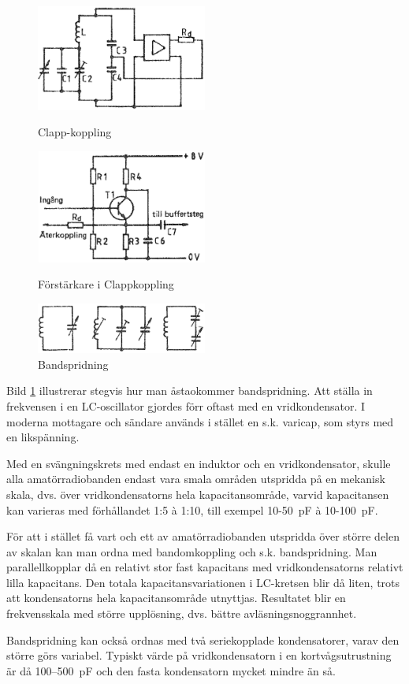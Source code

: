 \begin{figure}
  \includegraphics[width=0.5\textwidth]{images/cropped_pdfs/bild_2_3-73a.pdf}
  \caption{Clapp-koppling}
  \label{fig:BildII3-73a}

  \includegraphics[width=0.5\textwidth]{images/cropped_pdfs/bild_2_3-73b.pdf}
  \caption{Förstärkare i Clappkoppling}
  \label{fig:BildII3-73b}

  \includegraphics[width=0.5\textwidth]{images/cropped_pdfs/bild_2_3-74.pdf}
  \caption{Bandspridning}
  \label{fig:BildII3-74}
\end{figure}

Bild \ref{fig:BildII3-74} illustrerar stegvis hur man åstaokommer
bandspridning.
Att ställa in frekvensen i en LC-oscillator gjordes förr oftast med en
vridkondensator.
I moderna mottagare och sändare används i stället en s.k. varicap, som styrs
med en likspänning.

Med en svängningskrets med endast en induktor och en vridkondensator, skulle
alla amatörradiobanden endast vara smala områden utspridda på en mekanisk
skala, dvs. över vridkondensatorns hela kapacitansområde, varvid
kapacitansen kan varieras med förhållandet 1:5 à 1:10, till exempel
10-50~pF à 10-100~pF.

För att i stället få vart och ett av amatörradiobanden utspridda över
större delen av skalan kan man ordna med bandomkoppling och s.k. bandspridning.
Man parallellkopplar då en relativt stor fast kapacitans med vridkondensatorns
relativt lilla kapacitans.
Den totala kapacitansvariationen i LC-kretsen blir då liten, trots att
kondensatorns hela kapacitansområde utnyttjas.
Resultatet blir en frekvensskala med större upplösning, dvs. bättre
avläsningsnoggrannhet.

Bandspridning kan också ordnas med två seriekopplade kondensatorer,
varav den större görs variabel.
Typiskt värde på vridkondensatorn i en kortvågsutrustning är då 100--500~pF
och den fasta kondensatorn mycket mindre än så.
